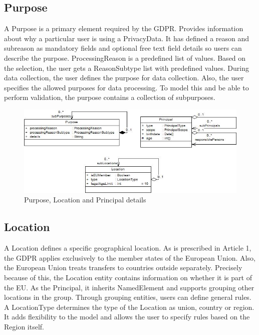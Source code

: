 \documentclass[11pt,english]{article}
\begin{document}
\subsection{Purpose}
A Purpose is a primary element required by the GDPR. Provides information about why a particular user is using a PrivacyData. It has defined a reason and subreason as mandatory fields and optional free text field details so users can describe the purpose. ProcessingReason is a predefined list of values. Based on the selection, the user gets a ReasonSubtype list with predefined values. During data collection, the user defines the purpose for data collection. Also, the user specifies the allowed purposes for data processing. To model this and be able to perform validation, the purpose contains a collection of subpurposes. 
\begin{figure}[H]
    \centering
    \includegraphics[width=12.5cm]{images/purposeAndPrincipal.jpg}
    \caption{Purpose, Location and Principal details}
    \label{fig:purpose}
\end{figure}
\subsection{Location}
A Location defines a specific geographical location. As is prescribed in Article 1, the GDPR applies exclusively to the member states of the European Union. Also, the European Union treats transfers to countries outside separately. Precisely because of this, the Location entity contains information on whether it is part of the EU. As the Principal, it inherits NamedElement and supports grouping other locations in the group. Through grouping entities, users can define general rules. A LocationType determines the type of the Location as union, country or region. It adds flexibility to the model and allows the user to specify rules based on the  Region itself.
\end{document}
